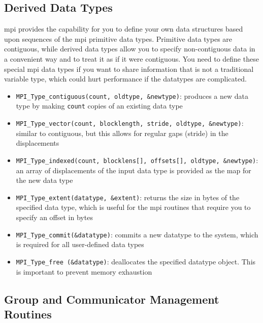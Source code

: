 \documentclass[10pt]{article}
\begin{document}
\begin{flushleft}
\subsection{Derived Data Types}

\gls{mpi} provides the capability for you to define your own data structures based upon sequences of the \gls{mpi} primitive data types. Primitive data types are contiguous, while derived data types allow you to specify non-contiguous data in a convenient way and to treat it as if it were contiguous. You need to define these special \gls{mpi} data types if you want to share information that is not a traditional variable type, which could hurt performance if the datatypes are complicated. 

\begin{itemize}
\item {\tt MPI\_Type\_contiguous(count, oldtype, \&newtype)}: produces a new data type by making {\tt count} copies of an existing data type
\item {\tt MPI\_Type\_vector(count, blocklength, stride, oldtype, \&newtype)}: similar to contiguous, but this allows for regular gaps (stride) in the displacements
\item {\tt MPI\_Type\_indexed(count, blocklens[], offsets[], oldtype, \&newtype)}: an array of displacements of the input data type is provided as the map for the new data type
\item {\tt MPI\_Type\_extent(datatype, \&extent)}: returns the size in bytes of the specified data type, which is useful for the \gls{mpi} routines that require you to specify an offset in bytes
\item {\tt MPI\_Type\_commit(\&datatype)}: commits a new datatype to the system, which is required for all user-defined data types 
\item {\tt MPI\_Type\_free (\&datatype)}: deallocates the specified datatype object. This is important to prevent memory exhaustion
\end{itemize}

\subsection{Group and Communicator Management Routines}


\end{flushleft}
\end{document}
